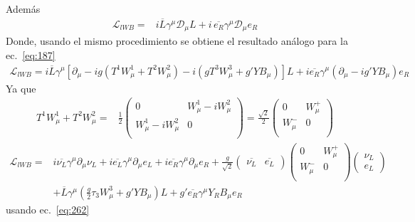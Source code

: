 Adem\'as
\begin{align}
  \mathcal{L}_{l W B}=&i\overline{L}\gamma^\mu\mathcal{D}_\mu L+i\,\overline{e_R}\gamma^\mu\mathcal{D}_\mu e_R
\end{align}
Donde, usando el mismo procedimiento se obtiene el resultado an\'alogo para la ec.~\eqref{eq:187}
\begin{align}
 \mathcal{L}_{l W B}=i\overline{L}\gamma^\mu[\partial_\mu-i g (T^1W_\mu^1+T^2W_\mu^2)-i(g T^3W_\mu^3+g' Y B_\mu)]L
+i\overline{e_R}\gamma^\mu(\partial_\mu-i g' Y B_\mu)e_R
\end{align}
Ya que
\begin{align}
  T^1W_\mu^1+T^2W_\mu^2=&\frac{1}{2}
  \begin{pmatrix}
    0             &W_\mu^1-i W_\mu^2\\
    W_\mu^1-i W_\mu^2  & 0          \\
  \end{pmatrix}=\frac{\sqrt{2}}{2}
  \begin{pmatrix}
    0             &W_\mu^+\\
    W_\mu^-  & 0          \\
  \end{pmatrix}
\end{align}
\begin{align}
\mathcal{L}_{l W B}=&i\overline{\nu_L}\gamma^\mu\partial_\mu\nu_L+i\overline{e_L}\gamma^\mu\partial_\mu e_L
+i\overline{e_R}\gamma^\mu\partial_\mu e_R+
  \frac{g}{\sqrt{2}}\begin{pmatrix}
    \overline{\nu_L}&\overline{e_L}
  \end{pmatrix} 
  \begin{pmatrix}
    0             &W_\mu^+\\
    W_\mu^-  & 0          \\
  \end{pmatrix}
  \begin{pmatrix}
    \nu_L\\
    e_L
  \end{pmatrix}\nonumber\\
&+\overline{L}\gamma^\mu\left(\frac{g}{2}\tau_3W_\mu^3+g'Y B_\mu\right)L+
g'\overline{e_R}\gamma^\mu Y_R B_\mu e_R
\end{align}
usando ec.~\eqref{eq:262}
